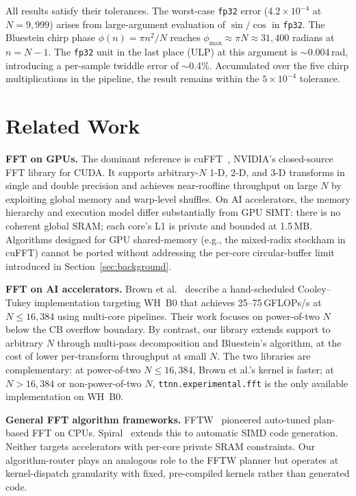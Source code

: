 \documentclass[conference]{IEEEtran}
\begin{document}
All results satisfy their tolerances. The worst-case \texttt{fp32} error
($4.2{\times}10^{-4}$ at $N = 9{,}999$) arises from large-argument evaluation
of $\sin/\cos$ in \texttt{fp32}. The Bluestein chirp phase
$\phi(n) = \pi n^2 / N$ reaches $\phi_{\max} \approx \pi N \approx 31{,}400$
radians at $n = N - 1$. The \texttt{fp32} unit in the last place (ULP) at this
argument is $\sim$0.004\,rad, introducing a per-sample twiddle error of
$\sim$0.4\%. Accumulated over the five chirp multiplications in the pipeline,
the result remains within the $5{\times}10^{-4}$ tolerance.

\section{Related Work}
\label{sec:related}

\textbf{FFT on GPUs.}
The dominant reference is cuFFT~\cite{cufft}, NVIDIA's closed-source FFT
library for CUDA. It supports arbitrary-$N$ 1-D, 2-D, and 3-D transforms in
single and double precision and achieves near-roofline throughput on large
$N$ by exploiting global memory and warp-level shuffles. On AI accelerators,
the memory hierarchy and execution model differ substantially from GPU SIMT:
there is no coherent global SRAM; each core's L1 is private and bounded at
1.5\,MB. Algorithms designed for GPU shared-memory (e.g., the mixed-radix
stockham in cuFFT) cannot be ported without addressing the per-core
circular-buffer limit introduced in Section~\ref{sec:background}.

\textbf{FFT on AI accelerators.}
Brown et al.~\cite{brown2025} describe a hand-scheduled Cooley–Tukey
implementation targeting WH~B0 that achieves 25–75\,GFLOPs/s at
$N \leq 16{,}384$ using multi-core pipelines. Their work focuses on
power-of-two $N$ below the CB overflow boundary. By contrast, our library
extends support to arbitrary $N$ through multi-pass decomposition and
Bluestein's algorithm, at the cost of lower per-transform throughput at small
$N$. The two libraries are complementary: at power-of-two $N \leq 16{,}384$,
Brown et al.'s kernel is faster; at $N > 16{,}384$ or non-power-of-two $N$,
\texttt{ttnn.experimental.fft} is the only available implementation on WH~B0.

\textbf{General FFT algorithm frameworks.}
FFTW~\cite{fftw} pioneered auto-tuned plan-based FFT on CPUs. Spiral~\cite{spiral}
extends this to automatic SIMD code generation. Neither targets accelerators
with per-core private SRAM constraints. Our algorithm-router plays an analogous
role to the FFTW planner but operates at kernel-dispatch granularity with fixed,
pre-compiled kernels rather than generated code.
\end{document}
